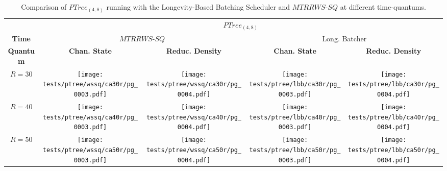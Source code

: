 \begin{table}[htp!]
    \centering
    \begin{tabular}{ccccc} & \multicolumn{4}{c}{ $PTree_{(4,8)}$ } \\ \cline{2-5}
    \multicolumn{1}{c}{\textbf{Time}} & \multicolumn{2}{c}{ $MTRRWS$-$SQ$ } & \multicolumn{2}{c}{ Long. Batcher} \\ \cline{2-5}
    \multicolumn{1}{c|}{\textbf{Quantum}} & \textbf{Chan. State} & \multicolumn{1}{c|}{\textbf{Reduc. Density}} 
                                                & \textbf{Chan. State} & \multicolumn{1}{c|}{\textbf{Reduc. Density}} \\ \cline{1-5}
    \multicolumn{1}{c|}{$R=30$} &  \multicolumn{1}{c}{\texttt{[image: tests/ptree/wssq/ca30r/pg\_0003.pdf]}} &
                                   \multicolumn{1}{c|}{\texttt{[image: tests/ptree/wssq/ca30r/pg\_0004.pdf]}} &
                                   \multicolumn{1}{c}{\texttt{[image: tests/ptree/lbb/ca30r/pg\_0003.pdf]}} &
                                   \multicolumn{1}{c|}{\texttt{[image: tests/ptree/lbb/ca30r/pg\_0004.pdf]}} \\ \cline{1-5}

    \multicolumn{1}{c|}{$R=40$} &  \multicolumn{1}{c}{\texttt{[image: tests/ptree/wssq/ca40r/pg\_0003.pdf]}} &
                                   \multicolumn{1}{c|}{\texttt{[image: tests/ptree/wssq/ca40r/pg\_0004.pdf]}} &
                                   \multicolumn{1}{c}{\texttt{[image: tests/ptree/lbb/ca40r/pg\_0003.pdf]}} &
                                   \multicolumn{1}{c|}{\texttt{[image: tests/ptree/lbb/ca40r/pg\_0004.pdf]}} \\ \cline{1-5}

    \multicolumn{1}{c|}{$R=50$} &  \multicolumn{1}{c}{\texttt{[image: tests/ptree/wssq/ca50r/pg\_0003.pdf]}} &
                                   \multicolumn{1}{c|}{\texttt{[image: tests/ptree/wssq/ca50r/pg\_0004.pdf]}} &
                                   \multicolumn{1}{c}{\texttt{[image: tests/ptree/lbb/ca50r/pg\_0003.pdf]}} &
                                   \multicolumn{1}{c|}{\texttt{[image: tests/ptree/lbb/ca50r/pg\_0004.pdf]}} \\ \cline{1-5}
    \end{tabular}
    \caption{Comparison of $PTree_{(4,8)}$ running with the Longevity-Based 
        Batching Scheduler and $MTRRWS$-$SQ$ at different time-quantums.} 
    \label{tab:ptree-longbatcher-testing}
\end{table}

